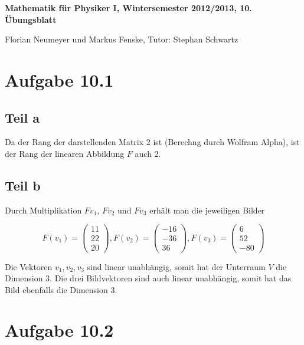\documentclass[a4paper,german,12pt,smallheadings]{scrartcl}
\begin{document}
\begin{center}
\bfseries %
\sffamily %
\vspace{-40pt}
Mathematik für Physiker I, Wintersemester 2012/2013, 10. Übungsblatt

Florian Neumeyer und Markus Fenske, Tutor: Stephan Schwartz
\vspace{-10pt}
\end{center}

\section*{Aufgabe 10.1}
\subsection*{Teil a}

Da der Rang der darstellenden Matrix 2 ist (Berechng durch Wolfram Alpha), ist
der Rang der linearen Abbildung $F$ auch 2.

\subsection*{Teil b}

Durch Multiplikation $Fv_1$, $Fv_2$ und $Fv_3$ erhält man die jeweiligen Bilder

\begin{equation}
  F(v_1) = \begin{pmatrix} 11 \\ 22 \\ 20 \end{pmatrix}, 
  F(v_2) = \begin{pmatrix} -16 \\ -36 \\ 36 \end{pmatrix},
  F(v_3) = \begin{pmatrix} 6 \\ 52 \\ -80 \end{pmatrix}
\end{equation}


Die Vektoren $v_1, v_2, v_3$ sind linear unabhängig, somit hat der Unterraum
$V$ die Dimension 3.  Die drei Bildvektoren sind auch linear unabhängig, somit hat das
Bild ebenfalls die Dimension 3.

\section*{Aufgabe 10.2}
\end{document}
